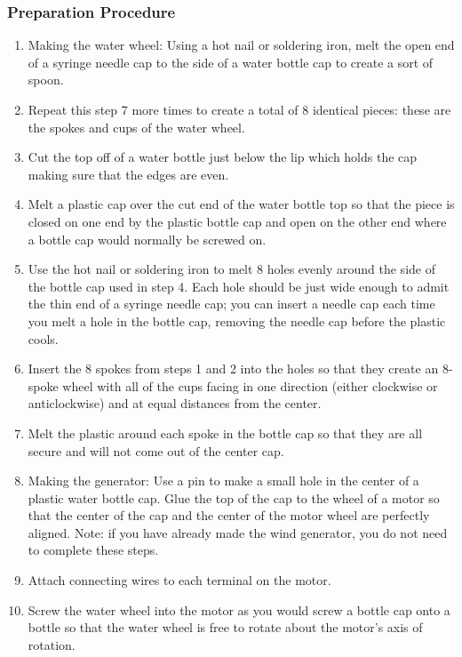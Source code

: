\subsubsection*{Preparation Procedure}
\begin{enumerate}
\item{Making the water wheel: Using a hot nail or soldering iron, melt the open end of a syringe needle cap to the side of a water bottle cap to create a sort of spoon.} 
\item{Repeat this step 7 more times to create a total of 8 identical pieces: these are the spokes and cups of the water wheel.} 
\item{Cut the top off of a water bottle just below the lip which holds the cap making sure that the edges are even.} 
\item{Melt a plastic cap over the cut end of the water bottle top so that the piece is closed on one end by the plastic bottle cap and open on the other end where a bottle cap would normally be screwed on.} 
\item{Use the hot nail or soldering iron to melt 8 holes evenly around the side of the bottle cap used in step 4. Each hole should be just wide enough to admit the thin end of a syringe needle cap; you can insert a needle cap each time you melt a hole in the bottle cap, removing the needle cap before the plastic cools.} 
\item{Insert the 8 spokes from steps 1 and 2 into the holes so that they create an 8-spoke wheel with all of the cups facing in one direction (either clockwise or anticlockwise) and at equal distances from the center.} 
\item{Melt the plastic around each spoke in the bottle cap so that they are all secure and will not come out of the center cap.} 
\item{Making the generator: Use a pin to make a small hole in the center of a plastic water bottle cap. Glue the top of the cap to the wheel of a motor so that the center of the cap and the center of the motor wheel are perfectly aligned. Note: if you have already made the wind generator, you do not need to complete these steps.} 
\item{Attach connecting wires to each terminal on the motor.} 
\item{Screw the water wheel into the motor as you would screw a bottle cap onto a bottle so that the water wheel is free to rotate about the motor's axis of rotation.} 
\end{enumerate}

